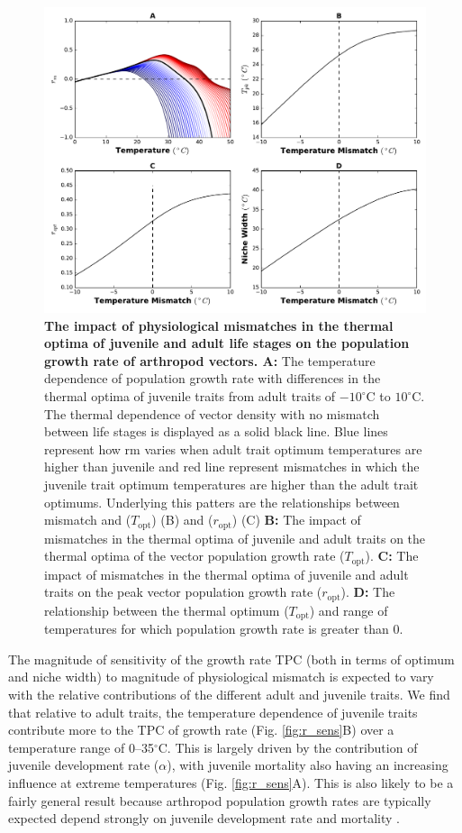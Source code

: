 \begin{figure}[H] 
	\centering
	\includegraphics[width = .7\textwidth]{results/ThermMM.pdf}
	\caption{{\bf The impact of physiological mismatches in the thermal optima of juvenile and adult life stages on the population growth rate of arthropod vectors. A:} The temperature dependence of  population growth rate with differences in the thermal optima of juvenile traits from adult traits of $-10^\circ$C to $10^\circ$C. The thermal dependence of vector density with no mismatch between life stages is displayed as a solid black line. Blue lines represent how rm varies when adult trait optimum temperatures are higher than juvenile and red line represent mismatches in which the juvenile trait optimum temperatures are higher than the adult trait optimums. Underlying this patters are the relationships between mismatch and ($T_\text{opt}$) (B) and ($r_\text{opt}$) (C) {\bf B:} The impact of mismatches in the thermal optima of juvenile and adult traits on the thermal optima of the vector population growth rate ($T_\text{opt}$).  {\bf C:} The impact of mismatches in the thermal optima of juvenile and adult traits on the peak vector population growth rate ($r_\text{opt}$). {\bf D:} The relationship between the thermal optimum ($T_\text{opt}$) and range of temperatures for which population growth rate is greater than 0.
	}
\label{fig:ThermMM}
\end{figure} 

The magnitude of sensitivity of the growth rate TPC (both in terms of optimum and niche width) to magnitude of physiological mismatch is expected to vary with the relative contributions of the different adult and juvenile traits. We find that relative to adult traits, the temperature dependence of juvenile traits contribute more to the TPC of growth rate (Fig. \ref{fig:r_sens}B) over a temperature range of 0--35$^\circ$C. This is largely driven by the contribution of juvenile development rate ($\alpha$), with juvenile mortality also having an increasing influence at extreme temperatures (Fig. \ref{fig:r_sens}A). This is also likely to be a fairly general result because arthropod population growth rates are typically expected depend strongly on juvenile development rate and mortality \citep{Birch1948}.

